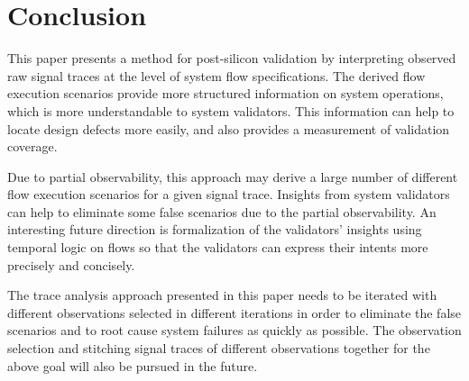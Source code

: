 \documentclass[conference]{IEEEtran}
\begin{document}
%
\section{Conclusion}

This paper presents a method for post-silicon validation by
interpreting observed raw signal traces at the level of
system flow specifications.  The derived flow execution
scenarios provide more structured information on system
operations, which is more understandable to system
validators.  This information can help to locate design
defects more easily, and also provides a measurement of
validation coverage.

Due to partial observability, this approach may derive a
large number of different flow execution scenarios for a
given signal trace.  Insights from system validators can
help to eliminate some false scenarios due to the partial
observability.  An interesting future direction is
formalization of the validators' insights using temporal
logic on flows so that the validators can express their
intents more precisely and concisely.

The trace analysis approach presented in this paper needs to
be iterated with different observations selected in
different iterations in order to eliminate the false
scenarios and to root cause system failures as quickly as
possible.  The observation selection and stitching signal
traces of different observations together for the above goal
will also be pursued in the future.






%
%
%





\end{document}
